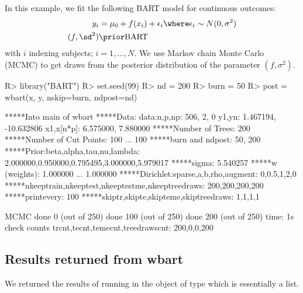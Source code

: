 \documentclass[article]{jss}
\begin{document}
In this example, we fit the following BART model for continuous outcomes:
\begin{align*}
y_i &= \mu_0 + f(x_i) + \epsilon_i \where \epsilon_i \sim N(0,\sigma^2) \\
(f, \sd^2) & \prior \mathrm{BART}
\end{align*}
with $i$ indexing subjects; $i=1, \dots, N$.  We use Markov chain
Monte Carlo (MCMC) to get draws from the posterior distribution of the
parameter $(f,\sigma^2)$. 

\begin{Sinput}
R> library("BART") 
R> set.seed(99)  
R> nd = 200       
R> burn = 50     
R> post = wbart(x, y, nskip=burn, ndpost=nd)
\end{Sinput}
\begin{Soutput}
*****Into main of wbart
*****Data:
data:n,p,np: 506, 2, 0
y1,yn: 1.467194, -10.632806
x1,x[n*p]: 6.575000, 7.880000
*****Number of Trees: 200
*****Number of Cut Points: 100 ... 100
*****burn and ndpost: 50, 200
*****Prior:beta,alpha,tau,nu,lambda: 2.000000,0.950000,0.795495,3.000000,5.979017
*****sigma: 5.540257
*****w (weights): 1.000000 ... 1.000000
*****Dirichlet:sparse,a,b,rho,augment: 0,0.5,1,2,0
*****nkeeptrain,nkeeptest,nkeeptestme,nkeeptreedraws: 200,200,200,200
*****printevery: 100
*****skiptr,skipte,skipteme,skiptreedraws: 1,1,1,1

MCMC
done 0 (out of 250)
done 100 (out of 250)
done 200 (out of 250)
time: 1s
check counts
trcnt,tecnt,temecnt,treedrawscnt: 200,0,0,200
\end{Soutput}

\subsection{Results returned from wbart}
 
We returned the results of running  in the object
 of type  which is essentially a list.
\end{document}
